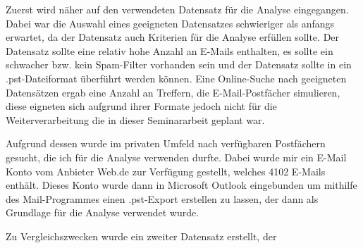 Zuerst wird näher auf den verwendeten Datensatz für die Analyse eingegangen. Dabei war die Auswahl eines geeigneten Datensatzes schwieriger als anfangs erwartet, da der Datensatz auch Kriterien für die Analyse erfüllen sollte. Der Datensatz sollte eine relativ hohe Anzahl an E-Mails enthalten, es sollte ein schwacher bzw. kein Spam-Filter vorhanden sein und der Datensatz sollte in ein .pst-Dateiformat überführt werden können. Eine Online-Suche nach geeigneten Datensätzen ergab eine Anzahl an Treffern, die E-Mail-Postfächer simulieren, diese eigneten sich aufgrund ihrer Formate jedoch nicht für die Weiterverarbeitung die in dieser Seminararbeit geplant war.

Aufgrund dessen wurde im privaten Umfeld nach verfügbaren Postfächern gesucht, die ich für die Analyse verwenden durfte. Dabei wurde mir ein E-Mail Konto vom Anbieter \glqq{}Web.de\grqq{} zur Verfügung gestellt, welches 4102 E-Mails enthält. Dieses Konto wurde dann in Microsoft Outlook eingebunden um mithilfe des Mail-Programmes einen .pst-Export erstellen zu lassen, der dann als Grundlage für die Analyse verwendet wurde.

Zu Vergleichszwecken wurde ein zweiter Datensatz erstellt, der 
